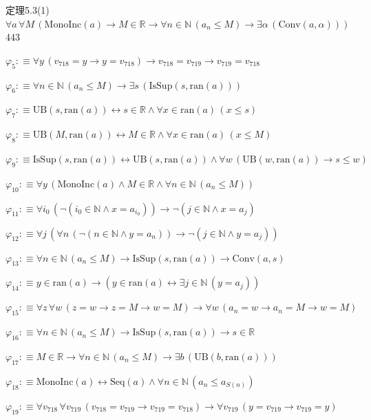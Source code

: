 \begin{fullproof}{定理5.3(1)}{$\forall a\,\forall M\,(\mathrm{MonoInc}(a) \to M \in \mathbb{R} \to \forall n \in \mathbb{N}\,(a_{n} \leq M) \to \exists \alpha\,(\mathrm{Conv}(a,\alpha)))$}{443}
\begin{abbrevlist}
\item $\varphi_{5} :\equiv \forall y\,(v_{718} = y \to y = v_{718}) \to v_{718} = v_{719} \to v_{719} = v_{718}$
\item $\varphi_{6} :\equiv \forall n \in \mathbb{N}\,(a_{n} \leq M) \to \exists s\,(\mathrm{IsSup}(s,\mathrm{ran}(a)))$
\item $\varphi_{7} :\equiv \mathrm{UB}(s,\mathrm{ran}(a)) \leftrightarrow s \in \mathbb{R} \land \forall x \in \mathrm{ran}(a)\,(x \leq s)$
\item $\varphi_{8} :\equiv \mathrm{UB}(M,\mathrm{ran}(a)) \leftrightarrow M \in \mathbb{R} \land \forall x \in \mathrm{ran}(a)\,(x \leq M)$
\item $\varphi_{9} :\equiv \mathrm{IsSup}(s,\mathrm{ran}(a)) \leftrightarrow \mathrm{UB}(s,\mathrm{ran}(a)) \land \forall w\,(\mathrm{UB}(w,\mathrm{ran}(a)) \to s \leq w)$
\item $\varphi_{10} :\equiv \forall y\,(\mathrm{MonoInc}(a) \land M \in \mathbb{R} \land \forall n \in \mathbb{N}\,(a_{n} \leq M))$
\item $\varphi_{11} :\equiv \forall i_{0}\,(\neg (i_{0} \in \mathbb{N} \land x = a_{i_{0}})) \to \neg (j \in \mathbb{N} \land x = a_{j})$
\item $\varphi_{12} :\equiv \forall j\,(\forall n\,(\neg (n \in \mathbb{N} \land y = a_{n})) \to \neg (j \in \mathbb{N} \land y = a_{j}))$
\item $\varphi_{13} :\equiv \forall n \in \mathbb{N}\,(a_{n} \leq M) \to \mathrm{IsSup}(s,\mathrm{ran}(a)) \to \mathrm{Conv}(a,s)$
\item $\varphi_{14} :\equiv y \in \mathrm{ran}(a) \to (y \in \mathrm{ran}(a) \leftrightarrow \exists j \in \mathbb{N}\,(y = a_{j}))$
\item $\varphi_{15} :\equiv \forall z\,\forall w\,(z = w \to z = M \to w = M) \to \forall w\,(a_{n} = w \to a_{n} = M \to w = M)$
\item $\varphi_{16} :\equiv \forall n \in \mathbb{N}\,(a_{n} \leq M) \to \mathrm{IsSup}(s,\mathrm{ran}(a)) \to s \in \mathbb{R}$
\item $\varphi_{17} :\equiv M \in \mathbb{R} \to \forall n \in \mathbb{N}\,(a_{n} \leq M) \to \exists b\,(\mathrm{UB}(b,\mathrm{ran}(a)))$
\item $\varphi_{18} :\equiv \mathrm{MonoInc}(a) \leftrightarrow \mathrm{Seq}(a) \land \forall n \in \mathbb{N}\,(a_{n} \leq a_{S(n)})$
\item $\varphi_{19} :\equiv \forall v_{718}\,\forall v_{719}\,(v_{718} = v_{719} \to v_{719} = v_{718}) \to \forall v_{719}\,(y = v_{719} \to v_{719} = y)$

\end{abbrevlist}
\end{fullproof}
